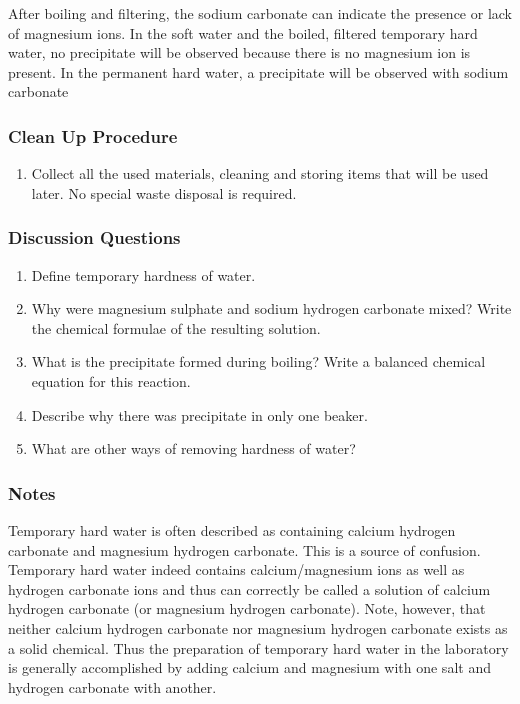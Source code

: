 {\begin{center}
\end{center}
After boiling and filtering, the sodium carbonate can indicate the presence or lack of magnesium ions. In the soft water and the boiled, filtered temporary hard water, no precipitate will be observed because there is no magnesium ion is present. In the permanent hard water, a precipitate will be observed with sodium carbonate


\subsubsection*{Clean Up Procedure}
\begin{enumerate}
\item{Collect all the used materials, cleaning and storing items that will be used later. No special waste disposal is required.}
\end{enumerate}

\subsubsection*{Discussion Questions}
\begin{enumerate}
\item{Define temporary hardness of water.}
\item{Why were magnesium sulphate and sodium hydrogen carbonate mixed? Write the chemical formulae of the resulting solution.}
\item{What is the precipitate formed during boiling? Write a balanced chemical equation for this reaction.}
\item{Describe why there was precipitate in only one beaker.}
\item{What are other ways of removing hardness of water?}
\end{enumerate}

\subsubsection*{Notes}
Temporary hard water is often described as containing calcium hydrogen carbonate and magnesium hydrogen carbonate. This is a source of confusion. Temporary hard water indeed contains calcium/magnesium ions as well as hydrogen carbonate ions and thus can correctly be called a solution of calcium hydrogen carbonate (or magnesium hydrogen carbonate). Note, however, that neither calcium hydrogen carbonate nor magnesium hydrogen carbonate exists as a solid chemical. Thus the preparation of temporary hard water in the laboratory is generally accomplished by adding calcium and magnesium with one salt and hydrogen carbonate with another.

}
